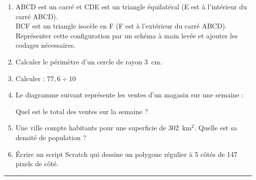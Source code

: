 \documentclass[a4paper,11pt]{article}
\newcommand{\np}[1]{\numprint{#1}}
\newcommand{\exercice}[2]{%
  \vspace{0.8cm}%
  \noindent\rule{\textwidth}{0.4pt}%
  \vspace{0.4cm}\par%
  \noindent{\Large\bfseries Exercice #1\hspace{0.3em}{\normalfont\normalsize(#2 points)}}%
  \par\vspace{0.5cm}%
}
\begin{document}
\begin{enumerate}[label=\textbf{\arabic*)}, leftmargin=1.2cm, itemsep=0.5cm]

\item ABCD est un carré et CDE est un triangle équilatéral (E est à l'intérieur du carré ABCD).\\
BCF est un triangle isocèle en F (F est à l'extérieur du carré ABCD).\\
Représenter cette configuration par un schéma à main levée et ajouter les codages nécessaires.

\item Calculer le périmètre d'un cercle de rayon 3~cm.

\item Calculer : $77{,}6 \div 10$

\item Le diagramme suivant représente les ventes d'un magasin sur une semaine :

\begin{center}
\end{center}

Quel est le total des ventes sur la semaine ?

\item Une ville compte \np{49298} habitants pour une superficie de 302~km$^2$. Quelle est sa densité de population ?

\item Écrire un script Scratch qui dessine un polygone régulier à 5 côtés de 147 pixels de côté.

\end{enumerate}

\exercice{2}{4}
\end{document}
